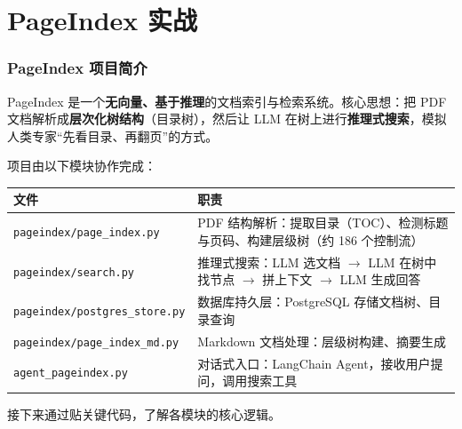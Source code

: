 \documentclass[presentation,aspectratio=169,fontset=none]{ctexbeamer}
\begin{document}

\section{PageIndex 实战}


\begin{frame}
\frametitle{PageIndex 项目简介}
{\footnotesize PageIndex 是一个\textbf{无向量、基于推理}的文档索引与检索系统。核心思想：把 PDF 文档解析成\textbf{层次化树结构}（目录树），然后让 LLM 在树上进行\textbf{推理式搜索}，模拟人类专家``先看目录、再翻页''的方式。}

\vspace{0.15cm}
{\footnotesize 项目由以下模块协作完成：}

\vspace{0.1cm}
\begin{table}
\centering
{\scriptsize
\begin{tabular}{lp{8.5cm}}
\toprule
\textbf{文件} & \textbf{职责} \\
\midrule
\texttt{pageindex/page\_index.py} & PDF 结构解析：提取目录（TOC）、检测标题与页码、构建层级树（约 186 个控制流） \\
\texttt{pageindex/search.py} & 推理式搜索：LLM 选文档 $\rightarrow$ LLM 在树中找节点 $\rightarrow$ 拼上下文 $\rightarrow$ LLM 生成回答 \\
\texttt{pageindex/postgres\_store.py} & 数据库持久层：PostgreSQL 存储文档树、目录查询 \\
\texttt{pageindex/page\_index\_md.py} & Markdown 文档处理：层级树构建、摘要生成 \\
\texttt{agent\_pageindex.py} & 对话式入口：LangChain Agent，接收用户提问，调用搜索工具 \\
\bottomrule
\end{tabular}}
\end{table}

\vspace{0.1cm}
{\footnotesize 接下来通过贴关键代码，了解各模块的核心逻辑。}
\end{frame}

\end{document}
